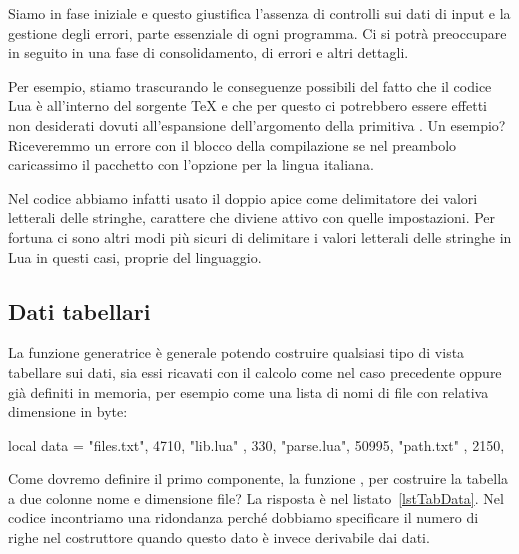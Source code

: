 Siamo in fase iniziale e questo giustifica l'assenza di controlli sui dati di
input e la gestione degli errori, parte essenziale di ogni programma. Ci si
potrà preoccupare in seguito in una fase di consolidamento, di errori e altri
dettagli.

Per esempio, stiamo trascurando le conseguenze possibili del fatto che il codice
Lua è all'interno del sorgente \TeX{} e che per questo ci potrebbero essere
effetti non desiderati dovuti all'espansione dell'argomento della primitiva
. Un esempio? Riceveremmo un errore con il blocco della
compilazione se nel preambolo caricassimo il pacchetto  con
l'opzione  per la lingua italiana.

Nel codice abbiamo infatti usato il doppio apice come delimitatore dei valori
letterali delle stringhe, carattere che diviene attivo con quelle impostazioni.
Per fortuna ci sono altri modi più sicuri di delimitare i valori letterali delle
stringhe in Lua in questi casi, proprie del linguaggio.


\subsection{Dati tabellari}

La funzione generatrice è generale potendo costruire qualsiasi tipo di vista
tabellare sui dati, sia essi ricavati con il calcolo come nel caso precedente
oppure già definiti in memoria, per esempio come una lista di nomi di file con
relativa dimensione in byte:
\begin{lines}
local data = {
    {"files.txt",  4710},
    {"lib.lua"  ,   330},
    {"parse.lua", 50995},
    {"path.txt" ,  2150},
}
\end{lines}

Come dovremo definire il primo componente, la funzione , per
costruire la tabella a due colonne nome e dimensione file? La risposta è nel
listato~\ref{lstTabData}. Nel codice incontriamo una ridondanza perché dobbiamo
specificare il numero di righe nel costruttore  quando questo dato è
invece derivabile dai dati. 

